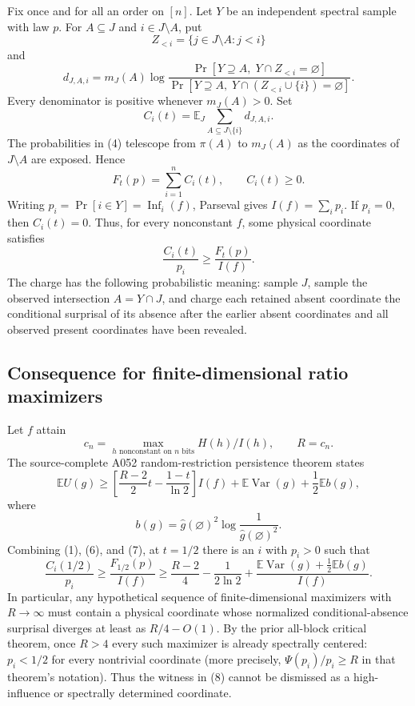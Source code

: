 Fix once and for all an order on $[n]$.  Let $Y$ be an independent spectral
sample with law $p$.  For $A\subseteq J$ and $i\in J\setminus A$, put
\[
 Z_{<i}=\{j\in J\setminus A:j<i\}
\]
and
\[
 d_{J,A,i}=m_J(A)\log
 \frac{\Pr[Y\supseteq A,\;Y\cap Z_{<i}=\varnothing]}
      {\Pr[Y\supseteq A,\;Y\cap(Z_{<i}\cup\{i\})=\varnothing]}.
                                                               \tag{4}
\]
Every denominator is positive whenever $m_J(A)>0$.  Set
\[
 C_i(t)=\mathbb E_J\sum_{A\subseteq J\setminus\{i\}}d_{J,A,i}.
\]
The probabilities in (4) telescope from $\pi(A)$ to $m_J(A)$ as the
coordinates of $J\setminus A$ are exposed.  Hence
\[
 F_t(p)=\sum_{i=1}^n C_i(t),\qquad C_i(t)\ge0.             \tag{5}
\]
Writing $p_i=\Pr[i\in Y]=\operatorname{Inf}_i(f)$, Parseval gives
$I(f)=\sum_i p_i$.  If $p_i=0$, then $C_i(t)=0$.  Thus, for every nonconstant
$f$, some physical coordinate satisfies
\[
 \boxed{\qquad \frac{C_i(t)}{p_i}\ge\frac{F_t(p)}{I(f)}.\qquad}          \tag{6}
\]
The charge has the following probabilistic meaning: sample $J$, sample the
observed intersection $A=Y\cap J$, and charge each retained absent coordinate
the conditional surprisal of its absence after the earlier absent coordinates
and all observed present coordinates have been revealed.

\subsection*{Consequence for finite-dimensional ratio maximizers}

Let $f$ attain
\[
 c_n=\max_{h\text{ nonconstant on }n\text{ bits}}H(h)/I(h),
 \qquad R=c_n.
\]
The source-complete A052 random-restriction persistence theorem states
\[
 \mathbb E U(g)\ge
 \left[\frac{R-2}{2}t-\frac{1-t}{\ln2}\right]I(f)
 +\mathbb E\operatorname{Var}(g)+\frac12\mathbb E b(g),                 \tag{7}
\]
where
\[
 b(g)=\widehat g(\varnothing)^2
       \log\frac1{\widehat g(\varnothing)^2}.
\]
Combining (1), (6), and (7), at $t=1/2$ there is an $i$ with $p_i>0$ such
that
\[
 \boxed{
 \frac{C_i(1/2)}{p_i}\ge \frac{F_{1/2}(p)}{I(f)}
 \ge \frac{R-2}{4}-\frac1{2\ln2}
 +\frac{\mathbb E\operatorname{Var}(g)+\frac12\mathbb E b(g)}{I(f)}.}  \tag{8}
\]
In particular, any hypothetical sequence of finite-dimensional maximizers
with $R\to\infty$ must contain a physical coordinate whose normalized
conditional-absence surprisal diverges at least as $R/4-O(1)$.  By the prior
all-block critical theorem, once $R>4$ every such maximizer is already
spectrally centered: $p_i<1/2$ for every nontrivial coordinate (more precisely,
$\Psi(p_i)/p_i\ge R$ in that theorem's notation).  Thus the witness in (8)
cannot be dismissed as a high-influence or spectrally determined coordinate.

